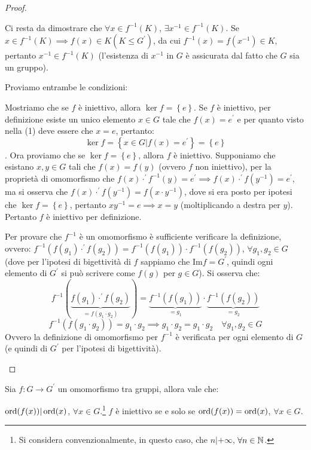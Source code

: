 \documentclass[11pt]{scrartcl}
\begin{document}
\begin{proof}
\begin{enumerate}[(1)]
\begin{enumerate}[(a)]
		\ii Ci resta da dimostrare che $\forall x \in f^{-1}(K)$, $\exists x^{-1} \in f^{-1}(K)$. Se $x \in  f^{-1}(K) \implies f(x) \in K (K \leqslant G^{\prime})$, da cui $f^{-1}(x)=f(x^{-1}) \in K$, pertanto $x^{-1} \in f^{-1}(K)$ (l'esistenza di $x^{-1}$ in $G$ è assicurata dal fatto che $G$ sia un gruppo).
		\end{enumerate}
	\ii Proviamo entrambe le condizioni:
		\begin{enumerate}[(a)]
			\ii Mostriamo che se $f$ è iniettivo, allora $\ker f = \left\{e\right\}$. Se $f$ è iniettivo, per definizione esiste un unico elemento $x \in G$ tale che $f(x)=e^{\prime}$ e per quanto visto nella (1) deve essere che $x=e$, pertanto:
				\[ \ker f=  \left\{x \in G | f(x) = e^{\prime}\right\}
				=
				\left\{e\right\}
				\]
			.
			\ii Ora proviamo che se $\ker f = \left\{e\right\}$, allora $f$ è iniettivo. Supponiamo che esistano $x,y \in G$ tali che $f(x)=f(y)$ (ovvero $f$ non iniettivo), per la proprietà di omomorfismo che $f(x)\cdot^{\prime}f^{-1}(y)=e^{\prime} \implies f(x)\cdot^{\prime}f(y^{-1})=e^{\prime}$, ma si osserva che $f(x)\cdot^{\prime}f(y^{-1})=f(x \cdot y^{-1})$, dove si era posto per ipotesi che $\ker f = \left\{e\right\}$, pertanto $xy^{-1}=e \implies x=y$ (moltiplicando a destra per $y$). Pertanto $f$ è iniettivo per definizione.
		\end{enumerate}
	\ii Per provare che $f^{-1}$ è un omomorfismo è sufficiente verificare la definizione, ovvero: $f^{-1}(f(g_1) \cdot^{\prime} f(g_2)) = f^{-1}(f(g_1)) \cdot f^{-1}(f(g_2))$, $\forall g_1, g_2 \in G$ (dove per l'ipotesi di bigettività di $f$ sappiamo che $\text{Im} f = G^{\prime}$, quindi ogni elemento di $G^{\prime}$ si può scrivere come $f(g)$ per $g \in G$). Si osserva che:
	\[ f^{-1}(\underbrace{f(g_1) \cdot^{\prime} f(g_2)}_{= f(g_1 \cdot g_2)}) = \underbrace{f^{-1}(f(g_1))}_{=g_1} \cdot\underbrace{f^{-1}(f(g_2))}_{=g_2}
	\]
	\[ f^{-1}(f(g_1 \cdot g_2)) = g_1 \cdot g_2 \implies g_1 \cdot g_2 = g_1 \cdot g_2 \quad \forall g_1,g_2 \in G
	\]
Ovvero la definizione di omomorfismo per $f^{-1}$ è verificata per ogni elemento di $G$ (e quindi di $G^{\prime}$ per l'ipotesi di bigettività).
\end{enumerate}
\end{proof}

\begin{theorem}
\label{thm:g_sei}
Sia $f:G \longrightarrow G^{\prime}$ un omomorfismo tra gruppi, allora vale che:
	\begin{itemize}
	\ii $\operatorname{ord} (f(x))|\operatorname{ord} (x)$, $\forall x \in G$.\footnote{Si considera convenzionalmente, in questo caso, che $n|+\infty$, $\forall n \in \mathbb N$.}
	\ii $f$ è iniettivo se e solo se $\operatorname{ord} (f(x)) = \operatorname{ord} (x)$, $\forall x \in G$.
	\end{itemize}
\end{theorem}
\end{document}
